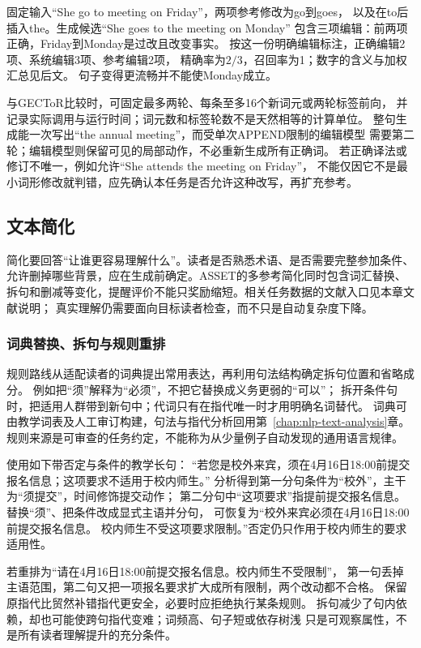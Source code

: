 固定输入“She go to meeting on Friday”，两项参考修改为go到goes，
以及在to后插入the。生成候选“She goes to the meeting on Monday”
包含三项编辑：前两项正确，Friday到Monday是过改且改变事实。
按这一份明确编辑标注，正确编辑2项、系统编辑3项、参考编辑2项，
精确率为$2/3$，召回率为1；数字的含义与加权汇总见后文。
句子变得更流畅并不能使Monday成立。

与GECToR比较时，可固定最多两轮、每条至多16个新词元或两轮标签前向，
并记录实际调用与运行时间；词元数和标签轮数不是天然相等的计算单位。
整句生成能一次写出“the annual meeting”，而受单次APPEND限制的编辑模型
需要第二轮；编辑模型则保留可见的局部动作，不必重新生成所有正确词。
若正确译法或修订不唯一，例如允许“She attends the meeting on Friday”，
不能仅因它不是最小词形修改就判错，应先确认本任务是否允许这种改写，再扩充参考。

\subsection{文本简化}
\label{sec:nlp-generation-simplification}

简化要回答“让谁更容易理解什么”。读者是否熟悉术语、是否需要完整参加条件、
允许删掉哪些背景，应在生成前确定。ASSET的多参考简化同时包含词汇替换、
拆句和删减等变化，提醒评价不能只奖励缩短。相关任务数据的文献入口见本章文献说明；
真实理解仍需要面向目标读者检查，而不只是自动复杂度下降。

\subsubsection{词典替换、拆句与规则重排}
\label{sec:nlp-generation-rule-simplification}

规则路线从适配读者的词典提出常用表达，再利用句法结构确定拆句位置和省略成分。
例如把“须”解释为“必须”，不把它替换成义务更弱的“可以”；
拆开条件句时，把适用人群带到新句中；代词只有在指代唯一时才用明确名词替代。
词典可由教学词表及人工审订构建，句法与指代分析回用第~\ref{chap:nlp-text-analysis}章。
规则来源是可审查的任务约定，不能称为从少量例子自动发现的通用语言规律。

使用如下带否定与条件的教学长句：
“若您是校外来宾，须在4月16日18:00前提交报名信息；这项要求不适用于校内师生。”
分析得到第一分句条件为“校外”，主干为“须提交”，时间修饰提交动作；
第二分句中“这项要求”指提前提交报名信息。替换“须”、把条件改成显式主语并分句，
可恢复为“校外来宾必须在4月16日18:00前提交报名信息。
校内师生不受这项要求限制。”否定仍只作用于校内师生的要求适用性。

若重排为“请在4月16日18:00前提交报名信息。校内师生不受限制”，
第一句丢掉主语范围，第二句又把一项报名要求扩大成所有限制，两个改动都不合格。
保留原指代比贸然补错指代更安全，必要时应拒绝执行某条规则。
拆句减少了句内依赖，却也可能使跨句指代变难；词频高、句子短或依存树浅
只是可观察属性，不是所有读者理解提升的充分条件。

